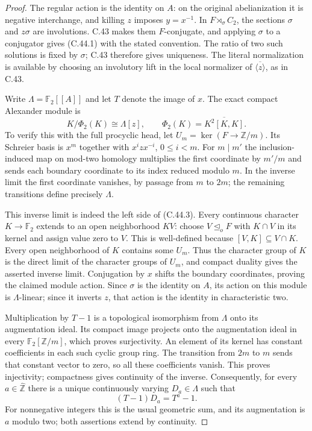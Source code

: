 \begin{proof}
The regular action is the identity on $A$: on the original
abelianization it is negative interchange, and killing $z$ imposes
$y=x^{-1}$. In $F\rtimes_\sigma C_2$, the sections $\sigma$ and
$z\sigma$ are involutions. C.43 makes them $F$-conjugate, and
applying $\sigma$ to a conjugator gives (C.44.1) with the stated
convention. The ratio of two such solutions is fixed by $\sigma$;
C.43 therefore gives uniqueness. The literal normalization is
available by choosing an involutory lift in the local normalizer
of $\overline{\langle z\rangle}$, as in C.43.

Write $\Lambda=\mathbb F_2[[A]]$ and let $T$ denote the image of
$x$. The exact compact Alexander module is
\[
 K/\Phi_2(K)\cong\Lambda[z],\qquad
 \Phi_2(K)=\overline{K^2[K,K]}.                              \tag{C.44.3}
\]
To verify this with the full procyclic head, let
$U_m=\ker(F\to\mathbb Z/m)$. Its Schreier basis is
$x^m$ together with $x^izx^{-i}$, $0\le i<m$.
For $m\mid m'$ the inclusion-induced map on mod-two homology
multiplies the first coordinate by $m'/m$ and sends each boundary
coordinate to its index reduced modulo $m$. In the inverse limit
the first coordinate vanishes, by passage from $m$ to $2m$;
the remaining transitions define precisely $\Lambda$.

This inverse limit is indeed the left side of (C.44.3).
Every continuous character $K\to\mathbb F_2$ extends to an
open neighborhood $KV$: choose $V\trianglelefteq_oF$ with
$K\cap V$ in its kernel and assign value zero to $V$.
This is well-defined because $[V,K]\subseteq V\cap K$.
Every open neighborhood of $K$ contains some $U_m$.
Thus the character group of $K$ is the direct limit of the
character groups of $U_m$, and compact duality gives the asserted
inverse limit. Conjugation by $x$ shifts the boundary coordinates,
proving the claimed module action. Since $\sigma$ is the identity
on $A$, its action on this module is $\Lambda$-linear; since it
inverts $z$, that action is the identity in characteristic two.

Multiplication by $T-1$ is a topological isomorphism from
$\Lambda$ onto its augmentation ideal. Its compact image projects
onto the augmentation ideal in every $\mathbb F_2[\mathbb Z/m]$,
which proves surjectivity. An element of its kernel has constant
coefficients in each such cyclic group ring. The transition from
$2m$ to $m$ sends that constant vector to zero, so all these
coefficients vanish. This proves injectivity; compactness gives
continuity of the inverse. Consequently, for every
$a\in\widehat{\mathbb Z}$ there is a unique continuously varying
$D_a\in\Lambda$ such that
\[
                    (T-1)D_a=T^a-1.                         \tag{C.44.4}
\]
For nonnegative integers this is the usual geometric sum, and its
augmentation is $a$ modulo two; both assertions extend by continuity.


\end{proof}
